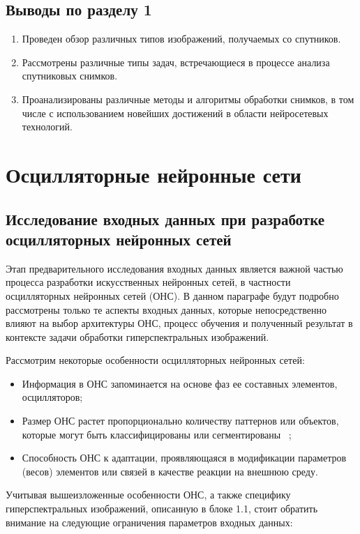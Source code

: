\documentclass[14pt, russian]{scrartcl}
\begin{document}
\subsection{Выводы по разделу 1}
\begin{enumerate}
    \item Проведен обзор различных типов изображений, получаемых со спутников.
    \item Рассмотрены различные типы задач, встречающиеся в процессе анализа спутниковых снимков.
    \item Проанализированы различные методы и алгоритмы обработки снимков, в том числе с использованием новейших достижений в области нейросетевых технологий.
\end{enumerate}

\section{Осцилляторные нейронные сети}\label{Sect::onn}

\subsection{Исследование входных данных при разработке осцилляторных нейронных сетей}

Этап предварительного исследования входных данных является важной частью процесса разработки искусственных нейронных сетей, в частности осцилляторных нейронных сетей (ОНС). В данном параграфе будут подробно рассмотрены только те аспекты входных данных, которые непосредственно влияют  на выбор архитектуры ОНС, процесс обучения и полученный результат в контексте задачи обработки гиперспектральных изображений.

Рассмотрим некоторые особенности осцилляторных нейронных сетей:

\begin{itemize}
    \item Информация в ОНС запоминается на основе фаз ее составных элементов, осцилляторов;
    \item Размер ОНС растет пропорционально количеству паттернов или объектов, которые могут быть классифицированы или сегментированы ~\cite{26};
    \item Способность ОНС к адаптации, проявляющаяся в модификации параметров (весов) элементов или связей в качестве реакции на внешнюю среду.
\end{itemize}

Учитывая вышеизложенные особенности ОНС, а также специфику гиперспектральных изображений, описанную в блоке 1.1, стоит обратить внимание на следующие ограничения параметров входных данных:
\end{document}
